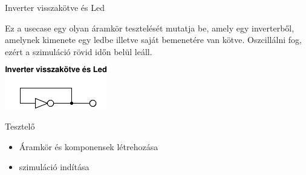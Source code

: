 \usecase
{Inverter visszakötve és Led}
{Ez a usecase egy olyan áramkör tesztelését mutatja be, amely egy inverterből, amelynek kimenete egy ledbe illetve saját bemenetére van kötve. Oszcillálni fog, ezért a szimuláció rövid időn belül leáll.
\newline
\begin{center}
\vspace{-15pt}
\includegraphics[scale=1.5]{dw/circuit_test4.pdf}
\vspace{-10pt}
\end{center}}
{Tesztelő}
{\vspace{-10pt}
\begin{itemize}
\setlength{\itemsep}{0cm}%
\setlength{\parskip}{0cm}%
\item Áramkör és komponensek létrehozása
\item szimuláció indítása

\end{itemize}}
